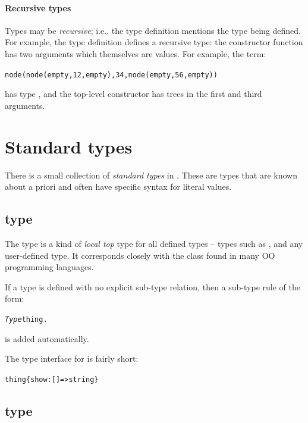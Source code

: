 \paragraph{Recursive types}
Types may be \emph{recursive}; i.e., the type definition mentions the type being defined. For example, the  type definition defines a recursive type:  the  constructor function has two arguments which themselves are  values. For example, the term:
\begin{alltt}
node(node(empty,12,empty),34,node(empty,56,empty))
\end{alltt}
has type , and the top-level  constructor has trees in the first and third arguments.

\section{Standard types}
\label{type:standard}

There is a small collection of \emph{standard types} in \go. These are types that are known about a priori and often have specific syntax for literal values.

\subsection{ type}
\label{types:thing}

The  type is a kind of \emph{local top} type for all defined types -- types such as ,  and any user-defined type. It corresponds closely with the  class found in many OO programming languages.

If a type is defined with no explicit sub-type relation, then a sub-type rule of the form:
\begin{alltt}
\emph{Type} \typearrow thing.
\end{alltt}
is added automatically.

The type interface for  is fairly short:
\begin{alltt}
thing \typearrow \{ show:[]=>string \}
\end{alltt}

\subsection{ type}
\label{types:char}

